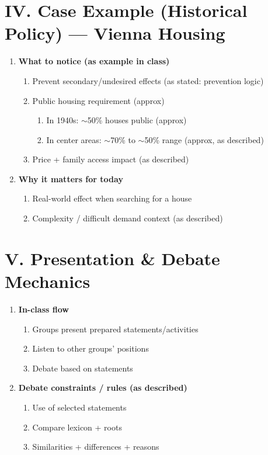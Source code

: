 \documentclass[10pt,a4paper]{article}
\begin{document}
\section*{IV. Case Example (Historical Policy) --- Vienna Housing}
\begin{enumerate}[label=\Alph*.]
\item \textbf{What to notice (as example in class)}
  \begin{enumerate}[label=\arabic*.]
  \item Prevent secondary/undesired effects (as stated: prevention logic)
  \item Public housing requirement (approx)
    \begin{enumerate}[label=\alph*.]
    \item In 1940s: $\sim$50\% houses public (approx)
    \item In center areas: $\sim$70\% to $\sim$50\% range (approx, as described)
    \end{enumerate}
  \item Price + family access impact (as described)
  \end{enumerate}
\item \textbf{Why it matters for today}
  \begin{enumerate}[label=\arabic*.]
  \item Real-world effect when searching for a house
  \item Complexity / difficult demand context (as described)
  \end{enumerate}
\end{enumerate}

\section*{V. Presentation \& Debate Mechanics}
\begin{enumerate}[label=\Alph*.]
\item \textbf{In-class flow}
  \begin{enumerate}[label=\arabic*.]
  \item Groups present prepared statements/activities
  \item Listen to other groups' positions
  \item Debate based on statements
  \end{enumerate}
\item \textbf{Debate constraints / rules (as described)}
  \begin{enumerate}[label=\arabic*.]
  \item Use of selected statements
  \item Compare lexicon + roots
  \item Similarities + differences + reasons
  \end{enumerate}
\end{enumerate}
\end{document}
